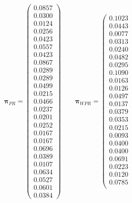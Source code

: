 \documentclass[11pt]{report}
\begin{document}
\begin{appendices}
\begin{figure} [H]  
\begin{equation*} 
\boldsymbol\pi_{PR} = \left(
\begin{array}{c}
0.0857\\
0.0300\\
0.0124\\
0.0256\\
0.0423\\
0.0557\\
0.0423\\
0.0867\\
0.0289\\
0.0289\\
0.0499\\
0.0215\\
0.0466\\
0.0237\\
0.0201\\
0.0252\\
0.0167\\
0.0167\\
0.0696\\
0.0389\\
0.0107\\
0.0634\\
0.0527\\
0.0601\\
0.0384
\end{array}
\right) \qquad 
\boldsymbol\pi_{WPR} = \left(
\begin{array}{c}
0.1023 \\
0.0443 \\
0.0077 \\
0.0313 \\
0.0240 \\
0.0482 \\
0.0295 \\
0.1090 \\
0.0163 \\
0.0126 \\
0.0497 \\
0.0137 \\
0.0379 \\
0.0353 \\
0.0215 \\
0.0093 \\
0.0400 \\
0.0400 \\
0.0691 \\
0.0223 \\
0.0120 \\
0.0785 \\

\end{array}
\end{equation*}
\end{figure}
\end{appendices}
\end{document}
